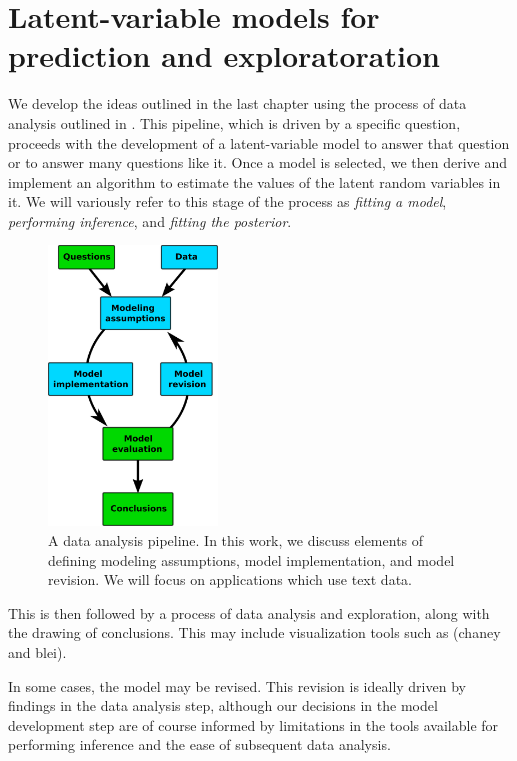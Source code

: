 \section{Latent-variable models for prediction and exploratoration}
\label{section:pipeline}

We develop the ideas outlined in the last chapter using the process of
data analysis outlined in .  This
pipeline, which is driven by a specific question, proceeds with the
development of a latent-variable model to answer that question or to
answer many questions like it.  Once a model is selected, we then
derive and implement an algorithm to estimate the values of the latent
random variables in it.  We will variously refer to this stage of the
process as \emph{fitting a model}, \emph{performing inference}, and
\emph{fitting the posterior}.

\begin{figure}
  \center \includegraphics[width=0.4\textwidth]{chapter_introductory_material/figs/model_pipeline.pdf}
  \caption{A data analysis pipeline.  In this work, we discuss
    elements of defining modeling assumptions, model implementation,
    and model revision.  We will focus on applications which use
    text data.}
  \label{figure:data_analysis_pipeline}
\end{figure}

This is then followed by a process of data analysis and exploration,
along with the drawing of conclusions.  This may include visualization
tools such as \cite{chaney:2012}(chaney and blei).

In some cases, the model may be revised.  This revision is ideally
driven by findings in the data analysis step, although our decisions
in the model development step are of course informed by limitations in
the tools available for performing inference and the ease of
subsequent data analysis.
  
